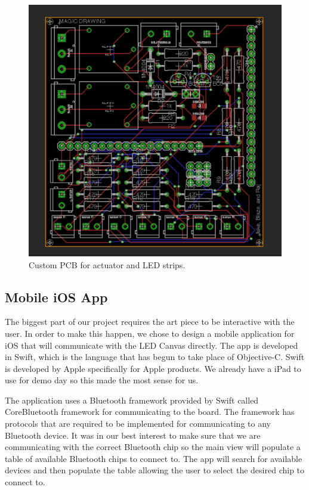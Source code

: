 \documentclass[11pt]{IEEEtran}
\begin{document}
\begin{figure}[H]
  \centering
  \includegraphics[width=\columnwidth]{pcb.png}
  \caption{Custom PCB for actuator and LED strips.}
  \label{fig:pcb}
\end{figure}


\subsection{Mobile iOS App}
The biggest part of our project requires the art piece to be interactive with the user. In order to make this happen, we chose to design a mobile application for iOS that will communicate with the LED Canvas directly. The app is developed in Swift, which is the language that has begun to take place of Objective-C. Swift is developed by Apple specifically for Apple products. We already have a iPad to use for demo day so this made the most sense for us.

The application uses a Bluetooth framework provided by Swift called CoreBluetooth framework for communicating to the board. The framework has protocols that are required to be implemented for communicating to any Bluetooth device. It was in our best interest to make sure that we are communicating with the correct Bluetooth chip so the main view will populate a table of available Bluetooth chips to connect to. The app will search for available devices and then populate the table allowing the user to select the desired chip to connect to.
\end{document}

